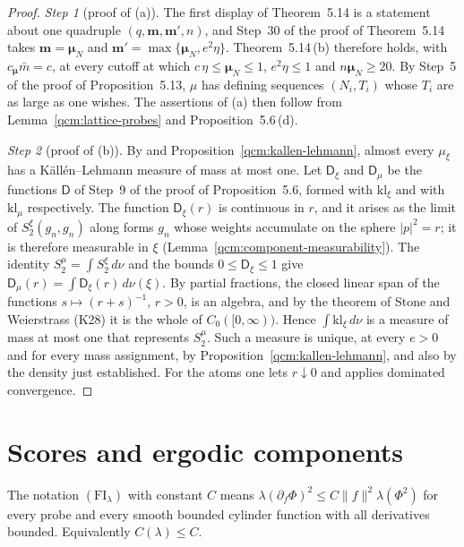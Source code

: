 \documentclass[11pt,letterpaper,reqno]{amsart}
\theoremstyle{definition}
\begin{document}
\begin{proof}
\emph{Step 1} (proof of (a)).
The first display of Theorem~5.14 is a statement about one quadruple $(q,\mathbf m,\mathbf m',n)$, and Step~30 of the proof of Theorem~5.14 takes $\mathbf m=\boldsymbol\mu_N$ and $\mathbf m'=\max\{\boldsymbol\mu_N,e^2\eta\}$.
Theorem~5.14\,(b) therefore holds, with $c_{\boldsymbol\mu}\bar m=c$, at every cutoff at which $c\,\eta\le\boldsymbol\mu_N\le1$, $e^2\eta\le1$ and $n\boldsymbol\mu_N\ge20$.
By Step~5 of the proof of Proposition~5.13, $\mu$ has defining sequences $(N_i,T_i)$ whose $T_i$ are as large as one wishes.
The assertions of (a) then follow from Lemma~\ref{qcm:lattice-probes} and Proposition~5.6\,(d).

\emph{Step 2} (proof of (b)).
By \cite[Theorem~A]{ErgodicComponents} and Proposition~\ref{qcm:kallen-lehmann}, almost every $\mu_\xi$ has a K\"all\'en--Lehmann measure of mass at most one.
Let $\mathsf D_\xi$ and $\mathsf D_\mu$ be the functions $\mathsf D$ of Step~9 of the proof of Proposition~5.6, formed with $\mathrm{kl}_\xi$ and with $\mathrm{kl}_\mu$ respectively.
The function $\mathsf D_\xi(r)$ is continuous in $r$, and it arises as the limit of $S_2^\xi(g_n,g_n)$ along forms $g_n$ whose weights accumulate on the sphere $|p|^2=r$; it is therefore measurable in $\xi$ (Lemma~\ref{qcm:component-measurability}).
The identity $S_2^\mu=\int S_2^\xi\,d\nu$ \cite[Theorem~A and Section~5]{ErgodicComponents} and the bounds $0\le\mathsf D_\xi\le1$ give $\mathsf D_\mu(r)=\int\mathsf D_\xi(r)\,d\nu(\xi)$.
By partial fractions, the closed linear span of the functions $s\mapsto(r+s)^{-1}$, $r>0$, is an algebra, and by the theorem of Stone and Weierstrass (K28) it is the whole of $C_0([0,\infty))$.
Hence $\int\mathrm{kl}_\xi\,d\nu$ is a measure of mass at most one that represents $S_2^\mu$.
Such a measure is unique, at every $e>0$ and for every mass assignment, by Proposition~\ref{qcm:kallen-lehmann}, and also by the density just established.
For the atoms one lets $r\downarrow0$ and applies dominated convergence.

\end{proof}


\section{Scores and ergodic components}

The notation $(\mathrm{FI}_\lambda)$ with constant $C$ means
$\lambda(\partial_f\Phi)^2\le C\|f\|^2\lambda(\Phi^2)$ for every
probe and every smooth bounded cylinder function with all derivatives bounded.
Equivalently $C(\lambda)\le C$.
\end{document}
